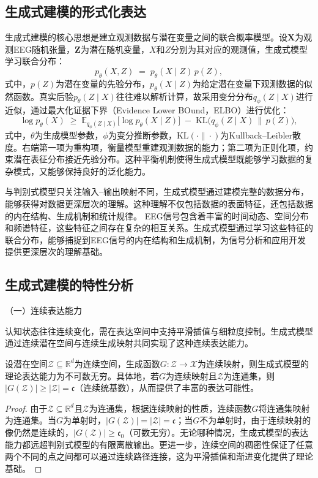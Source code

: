 \subsection{生成式建模的形式化表达}
生成式建模的核心思想是建立观测数据与潜在变量之间的联合概率模型。设$\mathbf{X}$为观测EEG随机张量，$\mathbf{Z}$为潜在随机变量，$X$和$Z$分别为其对应的观测值，生成式模型学习联合分布：
\begin{equation}
\label{eq:joint}
p_{\theta}(X,Z) \;=\; p_{\theta}(X\mid Z)\,p(Z),
\end{equation}
式中，$p(Z)$为潜在变量的先验分布，$p_{\theta}(X\mid Z)$为给定潜在变量下观测数据的似然函数。真实后验$p_{\theta}(Z\mid X)$往往难以解析计算，故采用变分分布$q_{\phi}(Z\mid X)$进行近似，通过最大化证据下界（Evidence Lower BOund，ELBO）进行优化：
\begin{equation}
\label{eq:elbo}
\log p_{\theta}(X) \;\ge\; \mathbb{E}_{q_{\phi}(Z\mid X)} \big[ \log p_{\theta}(X\mid Z) \big] \;-\; \mathrm{KL}\!\big(q_{\phi}(Z\mid X)\,\|\,p(Z)\big),
\end{equation}
式中，$\theta$为生成模型参数，$\phi$为变分推断参数，$\mathrm{KL}(\cdot\|\cdot)$为Kullback–Leibler散度。右端第一项为重构项，衡量模型重建观测数据的能力；第二项为正则化项，约束潜在表征分布接近先验分布。这种平衡机制使得生成式模型既能够学习数据的复杂模式，又能够保持良好的泛化能力。

与判别式模型只关注输入--输出映射不同，生成式模型通过建模完整的数据分布，能够获得对数据更深层次的理解。这种理解不仅包括数据的表面特征，还包括数据的内在结构、生成机制和统计规律。
EEG信号包含着丰富的时间动态、空间分布和频谱特征，这些特征之间存在复杂的相互关系。生成式模型通过学习这些特征的联合分布，能够捕捉到EEG信号的内在结构和生成机制，为信号分析和应用开发提供更深层次的理解基础。

\subsection{生成式建模的特性分析}

（一）连续表达能力

认知状态往往连续变化，需在表达空间中支持平滑插值与细粒度控制。生成式模型通过连续潜在空间与连续生成映射共同实现了这种连续表达能力。
\begin{theorem}[连续潜在空间的表达优势]
\label{thm:g-exp}
设潜在空间$\mathcal{Z} \subseteq \mathbb{R}^d$为连续空间，生成函数$G: \mathcal{Z} \rightarrow \mathcal{X}$为连续映射，则生成式模型的理论表达能力为不可数无穷。具体地，若$G$为连续映射且$\mathcal{Z}$为连通集，则$|G(\mathcal{Z})| \geq |\mathcal{Z}| = \mathfrak{c}$（连续统基数），从而提供了丰富的表达可能性。
\end{theorem}
\begin{proof}
由于$\mathcal{Z} \subseteq \mathbb{R}^d$且$\mathcal{Z}$为连通集，根据连续映射的性质，连续函数$G$将连通集映射为连通集。当$G$为单射时，$|G(\mathcal{Z})| = |\mathcal{Z}| = \mathfrak{c}$；当$G$不为单射时，由于连续映射的像仍然是连续的，$|G(\mathcal{Z})| \geq \mathfrak{c}_0$（可数无穷）。无论哪种情况，生成式模型的表达能力都远超判别式模型的有限离散输出。更进一步，连续空间的稠密性保证了任意两个不同的点之间都可以通过连续路径连接，这为平滑插值和渐进变化提供了理论基础。
\end{proof}

